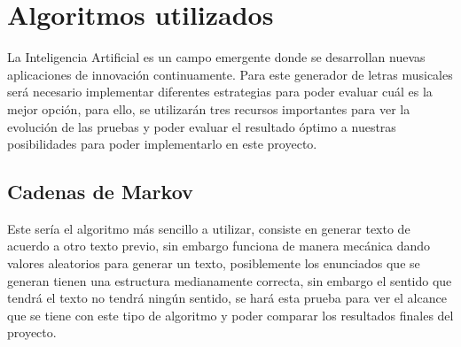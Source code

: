 \documentclass[12pt, a4paper, titlepage]{report}
\begin{document}
	   	\section{Algoritmos utilizados} %
	   	La Inteligencia Artificial es un campo emergente donde se desarrollan nuevas aplicaciones de innovación continuamente.
	   	Para este generador de letras musicales será necesario implementar diferentes estrategias para poder evaluar cuál es la mejor opción, para ello, se utilizarán tres recursos importantes para ver la evolución de las pruebas y poder evaluar el resultado óptimo a nuestras posibilidades para poder implementarlo en este proyecto.
	   	
	   	\subsection{Cadenas de Markov}
	   	Este sería el algoritmo más sencillo a utilizar, consiste en generar texto de acuerdo a otro texto previo, sin embargo funciona de manera mecánica dando valores aleatorios para generar un texto, posiblemente los enunciados que se generan tienen una estructura medianamente correcta, sin embargo el sentido que tendrá el texto no tendrá ningún sentido, se hará esta prueba para ver el alcance que se tiene con este tipo de algoritmo y poder comparar los resultados finales del proyecto. 
	   	
\end{document}
